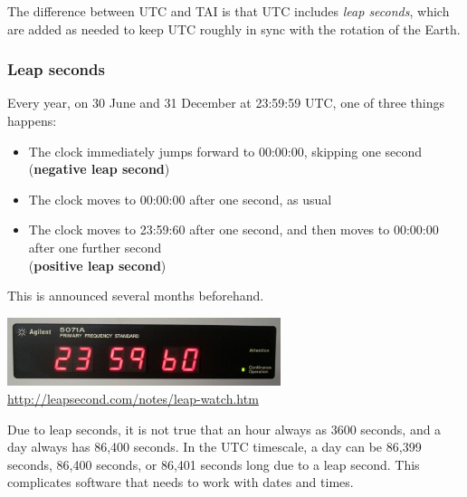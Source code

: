 \label{l:utc}



The difference between UTC and TAI is that UTC includes \emph{leap seconds}, which are added as needed to keep UTC roughly in sync with the rotation of the Earth.

\begin{frame}
    \label{s:leap-seconds}
    \frametitle{Leap seconds}
    Every year, on 30 June and 31 December at 23:59:59 UTC, one of three things happens:
    \begin{itemize}
        \item The clock immediately jumps forward to 00:00:00, skipping one second (\textbf{negative leap second})
        \item The clock moves to 00:00:00 after one second, as usual
        \item The clock moves to 23:59:60 after one second, and then moves to 00:00:00 after one further second\\
            (\textbf{positive leap second})
    \end{itemize}
    This is announced several months beforehand.
    \begin{center}
        \includegraphics[width=8cm]{images/leap-second.jpg}
        \scriptsize\url{http://leapsecond.com/notes/leap-watch.htm}
    \end{center}
\end{frame}
\label{l:leap-seconds}

Due to leap seconds, it is not true that an hour always as 3600 seconds, and a day always has 86,400 seconds.
In the UTC timescale, a day can be 86,399 seconds, 86,400 seconds, or 86,401 seconds long due to a leap second.
This complicates software that needs to work with dates and times.

